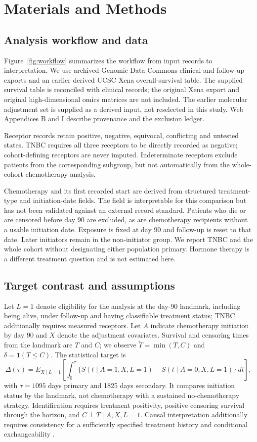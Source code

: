 \documentclass[12pt,letterpaper]{article}
\newcommand{\ind}{\mathbf{1}}
\begin{document}
\section{Materials and Methods}
\subsection{Analysis workflow and data}
Figure~\ref{fig:workflow} summarizes the workflow from input records to interpretation.
We use archived Genomic Data Commons clinical and follow-up exports and an earlier derived
UCSC Xena overall-survival table. The supplied survival table is reconciled with clinical records;
the original Xena export and original high-dimensional omics matrices are not included.
The earlier molecular adjustment set is supplied as a derived input, not reselected in this study.
Web Appendices B and I describe provenance and the exclusion ledger.

Receptor records retain positive, negative, equivocal, conflicting and untested states.
TNBC requires all three receptors to be directly recorded as negative; cohort-defining receptors
are never imputed. Indeterminate receptors exclude patients from the corresponding subgroup,
but not automatically from the whole-cohort chemotherapy analysis.

Chemotherapy and its first recorded start are derived from structured treatment-type and initiation-date fields.
The field is interpretable for this comparison but has not been validated against an external record standard.
Patients who die or are censored before day 90 are excluded, as are chemotherapy recipients without
a usable initiation date. Exposure is fixed at day 90 and follow-up is reset to that date.
Later initiators remain in the non-initiator group. We report TNBC and the whole cohort without
designating either population primary. Hormone therapy is a different treatment question and is not estimated here.

\subsection{Target contrast and assumptions}
Let $L=1$ denote eligibility for the analysis at the day-90 landmark, including being alive,
under follow-up and having classifiable treatment status; TNBC additionally requires measured receptors.
Let $A$ indicate chemotherapy initiation by day 90 and $X$ denote the adjustment covariates.
Survival and censoring times from the landmark are $T$ and $C$; we observe
$\widetilde T=\min(T,C)$ and $\delta=\ind(T\le C)$.
The statistical target is
\begin{equation}
\Delta(\tau)=E_{X\mid L=1}\left[\int_0^\tau
\{S(t\mid A=1,X,L=1)-S(t\mid A=0,X,L=1)\}\,dt\right],
\label{eq:target}
\end{equation}
with $\tau=1095$ days primary and 1825 days secondary. It compares initiation status by the landmark,
not chemotherapy with a sustained no-chemotherapy strategy.
Identification requires treatment positivity, positive censoring survival through the horizon,
and $C\perp T\mid A,X,L=1$. Causal interpretation additionally requires consistency for a
sufficiently specified treatment history and conditional exchangeability \citep{hernanbook}.
\end{document}
